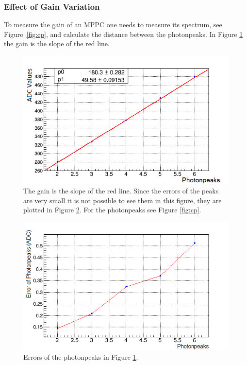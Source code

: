 \documentclass[a4paper]{article}\linespread{1.4}
\begin{document}
\subsubsection{Effect of Gain Variation}
\label{chap:gdf}
To measure the gain of an MPPC one needs to measure its spectrum, see Figure~\ref{fig:cp}, and calculate the distance between the photonpeaks.
In Figure \ref{fig:gain} the gain is the slope of the red line.%
\begin{figure}[] \hspace*{-1cm} \includegraphics[width=130mm,scale=2.0]{figures/gain.png} \caption{The gain is the slope of the red line. Since the errors of the peaks are very small it is not possible to see them in this figure, they are plotted in Figure \ref{fig:gaine}. For the photonpeaks see Figure \ref{fig:cp}.} \label{fig:gain}\end{figure}
\begin{figure}[] \hspace*{-1cm} \includegraphics[width=130mm,scale=2.0]{figures/gaine.png} \caption{Errors of the photonpeaks in Figure \ref{fig:gain}.} \label{fig:gaine}\end{figure}
\end{document}
